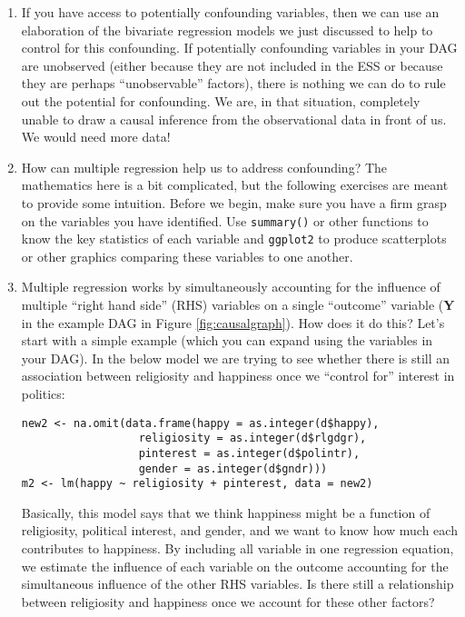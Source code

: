 \documentclass[a4paper,12pt]{article}
\begin{document}
\begin{enumerate}
\item If you have access to potentially confounding variables, then we can use an elaboration of the bivariate regression models we just discussed to help to control for this confounding. If potentially confounding variables in your DAG are unobserved (either because they are not included in the ESS or because they are perhaps ``unobservable'' factors), there is nothing we can do to rule out the potential for confounding. We are, in that situation, completely unable to draw a causal inference from the observational data in front of us. We would need more data!

\item How can multiple regression help us to address confounding? The mathematics here is a bit complicated, but the following exercises are meant to provide some intuition. Before we begin, make sure you have a firm grasp on the variables you have identified. Use \texttt{summary()} or other functions to know the key statistics of each variable and \texttt{ggplot2} to produce scatterplots or other graphics comparing these variables to one another.

\item Multiple regression works by simultaneously accounting for the influence of multiple ``right hand side'' (RHS) variables on a single ``outcome'' variable (\textbf{Y} in the example DAG in Figure \ref{fig:causalgraph}). How does it do this? Let's start with a simple example (which you can expand using the variables in your DAG). In the below model we are trying to see whether there is still an association between religiosity and happiness once we ``control for'' interest in politics:

\begin{verbatim}
new2 <- na.omit(data.frame(happy = as.integer(d$happy),
                  religiosity = as.integer(d$rlgdgr),
                  pinterest = as.integer(d$polintr),
                  gender = as.integer(d$gndr)))
m2 <- lm(happy ~ religiosity + pinterest, data = new2)
\end{verbatim}

\noindent Basically, this model says that we think happiness might be a function of religiosity, political interest, and gender, and we want to know how much each contributes to happiness. By including all variable in one regression equation, we estimate the influence of each variable on the outcome accounting for the simultaneous influence of the other RHS variables. Is there still a relationship between religiosity and happiness once we account for these other factors?


\end{enumerate}
\end{document}
